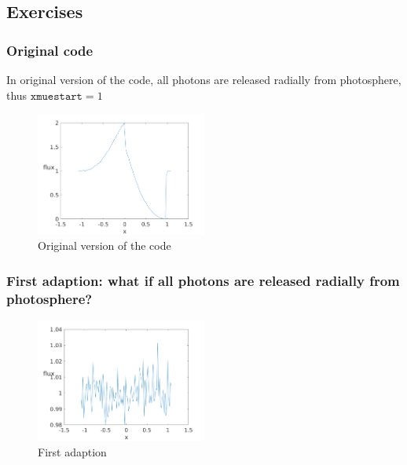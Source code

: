 \documentclass[10pt,a4paper]{article}
\begin{document}
\newpage
\subsection{Exercises}
\subsubsection{Original code}
In original version of the code, all photons are released radially from photosphere, thus $\texttt{xmuestart} = 1$

\begin{figure}[!htp]
\centering
\includegraphics[width=0.5\textwidth]{../../introductory_exercises/P_Cygni_profile_UV_resonance/npot6xk0100alpha0beta1test0.png}
\caption{Original version of the code}
\end{figure}

\subsubsection{First adaption: what if all photons are released radially from photosphere?}
\begin{figure}[!htbp]
\centering
\includegraphics[width=0.5\textwidth]{../../introductory_exercises/P_Cygni_profile_UV_resonance/npot6xk0100alpha0beta1test1.png}
\caption{First adaption}
\end{figure}
\end{document}
